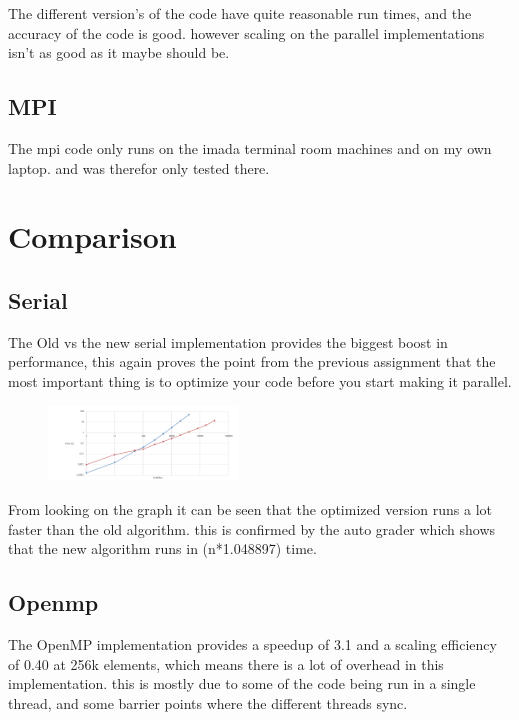 \documentclass[a4paper,10pt,titlepage]{report}
\begin{document}
The different version's of the code have quite reasonable run times, and the accuracy of the code is good. however scaling on the parallel implementations isn't as good as it maybe should be.  \\

\subsection{MPI}
The mpi code only runs on the imada terminal room machines and on my own laptop. and was therefor only tested there.

\section{Comparison}

\subsection{Serial}
The Old vs the new serial implementation provides the biggest boost in performance, this again proves the point from the previous assignment that the most important thing is to optimize your code before you start making it parallel. \\
\begin{figure} %
    \centering
    \includegraphics[width=0.45\textwidth]{oldvsnew}
\end{figure}

From looking on the graph it can be seen that the optimized version runs a lot faster than the old algorithm. this is confirmed by the auto grader which shows that the new algorithm runs in (n*1.048897) time.


\subsection{Openmp}
The OpenMP implementation provides a speedup of 3.1 and a scaling efficiency of 0.40 at 256k elements, which means there is a lot of overhead in this implementation. this is mostly due to some of the code being run in a single thread, and some barrier points where the different threads sync.
\end{document}
